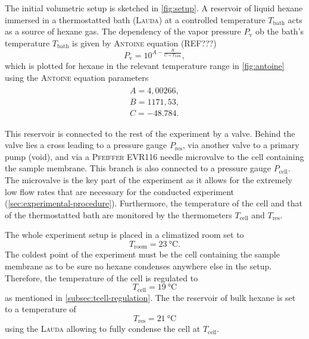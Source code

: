 \documentclass[../thesis.tex]{subfiles}
\begin{document}
        The initial volumetric setup is sketched in \cref{fig:setup}. A reservoir of liquid hexane immersed in a thermostatted bath (\textsc{Lauda}) at a controlled temperature $T_\mathrm{bath}$ acts as a source of hexane gas. The dependency of the vapor pressure $P_\mathrm{v}$ ob the bath's temperature $T_\mathrm{bath}$ is given by \textsc{Antoine} equation (REF???)
        \begin{equation}
          P_\mathrm{v}=10^{A- \frac{B}{C+T_\mathrm{bath}}},
          \label{eq:antoine-equation}
        \end{equation}
        which is plotted for hexane in the relevant temperature range in \cref{fig:antoine} using the \textsc{Antoine} equation parameters
        \begin{align}
          \begin{split}
              A=4,00266,	\\
              B=1171,53,  \\
              C=-48.784.
          \end{split}
          \label{eq:antoine-parameters} %
        \end{align}

        

        This reservoir is connected to the rest of the experiment by a valve. Behind the valve lies a cross leading to a pressure gauge $P_\mathrm{res}$, via another valve to a primary pump (void), and via a \textsc{Pfeiffer} EVR116 needle microvalve to the cell containing the sample membrane. This branch is also connected to a pressure gauge $P_\mathrm{cell}$. The microvalve is the key part of the experiment as it allows for the extremely low flow rates that are necessary for the conducted experiment (\cref{sec:experimental-procedure}). Furthermore, the temperature of the cell and that of the thermostatted bath are monitored by the thermometers $T_\mathrm{cell}$ and $T_\mathrm{res}$.
        \medskip

        

        The whole experiment setup is placed in a climatized room set to \begin{equation}
            T_\mathrm{room} = \SI{23}{\celsius}.
        \end{equation}
        The coldest point of the experiment must be the cell containing the sample membrane as to be sure no hexane condenses anywhere else in the setup. Therefore, the temperature of the cell is regulated to
        \begin{equation}
            T_\mathrm{cell} = \SI{19}{\celsius}
        \end{equation}
        as mentioned in \cref{subsec:tcell-regulation}. The the reservoir of bulk hexane is set to a temperature of
        \begin{equation}
            T_\mathrm{res} = \SI{21}{\celsius}
        \end{equation}
        using the \textsc{Lauda} allowing to fully condense the cell at $T_\mathrm{cell}$.
\end{document}
